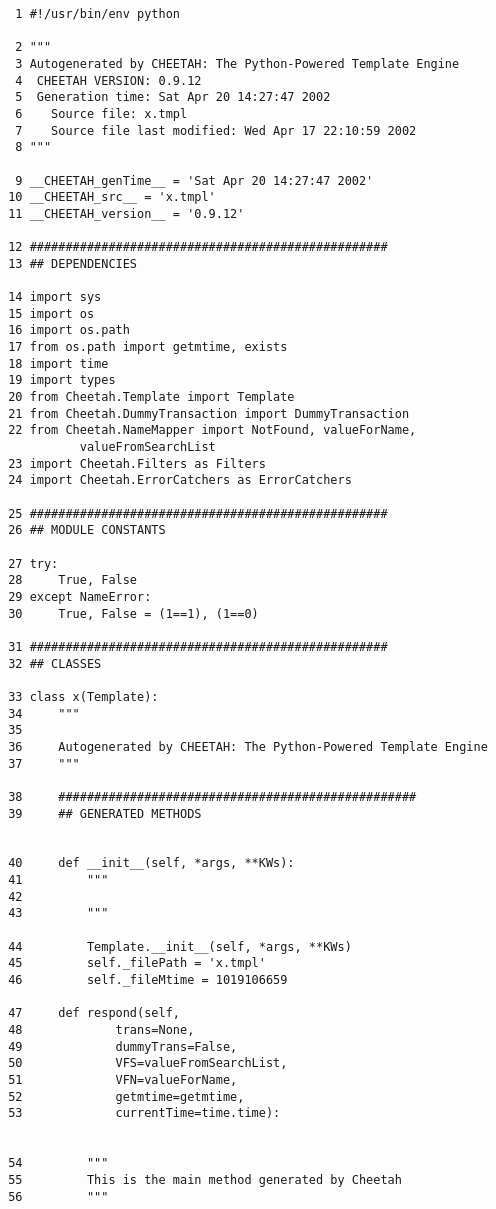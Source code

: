 \begin{verbatim}
  1	#!/usr/bin/env python
    
  2	"""
  3	Autogenerated by CHEETAH: The Python-Powered Template Engine
  4	 CHEETAH VERSION: 0.9.12
  5	 Generation time: Sat Apr 20 14:27:47 2002
  6	   Source file: x.tmpl
  7	   Source file last modified: Wed Apr 17 22:10:59 2002
  8	"""
    
  9	__CHEETAH_genTime__ = 'Sat Apr 20 14:27:47 2002'
 10	__CHEETAH_src__ = 'x.tmpl'
 11	__CHEETAH_version__ = '0.9.12'
    
 12	##################################################
 13	## DEPENDENCIES
    
 14	import sys
 15	import os
 16	import os.path
 17	from os.path import getmtime, exists
 18	import time
 19	import types
 20	from Cheetah.Template import Template
 21	from Cheetah.DummyTransaction import DummyTransaction
 22	from Cheetah.NameMapper import NotFound, valueForName, 
           valueFromSearchList
 23	import Cheetah.Filters as Filters
 24	import Cheetah.ErrorCatchers as ErrorCatchers
    
 25	##################################################
 26	## MODULE CONSTANTS
    
 27	try:
 28	    True, False
 29	except NameError:
 30	    True, False = (1==1), (1==0)
    
 31	##################################################
 32	## CLASSES
    
 33	class x(Template):
 34	    """
 35	    
 36	    Autogenerated by CHEETAH: The Python-Powered Template Engine
 37	    """
    
 38	    ##################################################
 39	    ## GENERATED METHODS
    
    
 40	    def __init__(self, *args, **KWs):
 41	        """
 42	        
 43	        """
    
 44	        Template.__init__(self, *args, **KWs)
 45	        self._filePath = 'x.tmpl'
 46	        self._fileMtime = 1019106659
    
 47	    def respond(self,
 48	            trans=None,
 49	            dummyTrans=False,
 50	            VFS=valueFromSearchList,
 51	            VFN=valueForName,
 52	            getmtime=getmtime,
 53	            currentTime=time.time):
    
    
 54	        """
 55	        This is the main method generated by Cheetah
 56	        """
    

\end{verbatim}
